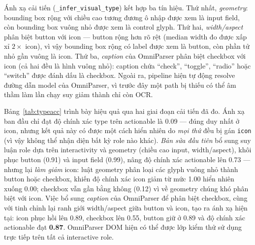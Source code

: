 \documentclass[11pt,a4paper]{article}
\newcommand{\code}[1]{\texttt{#1}}
\begin{document}
Ánh xạ cải tiến (\code{\_infer\_visual\_type}) kết hợp ba tín hiệu. Thứ nhất,
\emph{geometry}: bounding box rộng với chiều cao tương đương ô nhập được xem là
input field, còn bounding box vuông nhỏ được xem là control glyph. Thứ hai,
\emph{width/aspect} phân biệt button với icon --- button rộng hơn rõ rệt (median
width đo được xấp xỉ $2\times$ icon), vì vậy bounding box rộng có label được xem là
button, còn phần tử nhỏ gần vuông là icon. Thứ ba, \emph{caption} của OmniParser
phân biệt checkbox với icon (cả hai đều là hình vuông nhỏ): caption chứa ``check'',
``toggle'', ``radio'' hoặc ``switch'' được đánh dấu là checkbox. Ngoài ra, pipeline
hiện tự động resolve đường dẫn model của OmniParser, vì trước đây một path bị thiếu
có thể âm thầm làm lần chạy suy giảm thành chỉ còn OCR.

Bảng~\ref{tab:typeacc} trình bày hiệu quả qua hai giai đoạn cải tiến đã đo. Ánh xạ
ban đầu chỉ đạt độ chính xác type trên actionable là 0.09 --- đúng duy nhất ở icon,
nhưng kết quả này có được một cách hiển nhiên do \emph{mọi thứ} đều bị gán
\code{icon} (vì vậy không thể nhận diện bất kỳ role nào khác). \emph{Bản sửa đầu
tiên} bổ sung suy luận role dựa trên interactivity và geometry (chiều cao input,
width/aspect), khôi phục button (0.91) và input field (0.99), nâng độ chính xác
actionable lên 0.73 --- nhưng lại \emph{làm giảm} icon: luật geometry phân loại các
glyph vuông nhỏ thành button hoặc checkbox, khiến độ chính xác icon giảm từ mức
1.00 hiển nhiên xuống 0.00; checkbox vẫn gần bằng không (0.12) vì về geometry chúng
khó phân biệt với icon. Việc bổ sung \emph{caption} của OmniParser để phân biệt
checkbox, cùng với tinh chỉnh lại ranh giới width/aspect giữa button và icon, tạo ra
ánh xạ hiện tại: icon phục hồi lên 0.89, checkbox lên 0.55, button giữ ở 0.89 và độ
chính xác actionable đạt \textbf{0.87}. OmniParser DOM hiện có thể được lớp kiểm thử
sử dụng trực tiếp trên tất cả interactive role.
\end{document}
